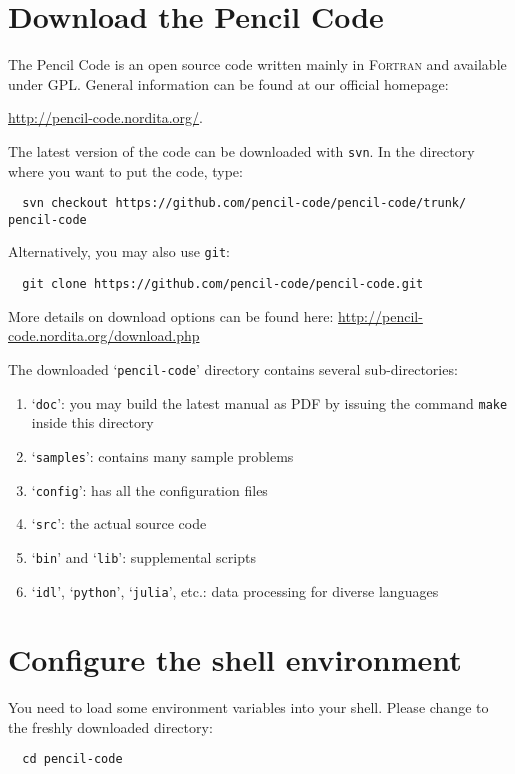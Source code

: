 \documentclass[a4paper,12pt]{article}
\newcommand{\command}[1]{\texttt{#1}}
\newcommand{\directory}[1]{`\texttt{#1}'}
\newcommand{\name}[1]{\textsc{#1}}
\begin{document}
\section{Download the Pencil Code}
The Pencil Code is an open source code written mainly in \name{Fortran} and available under GPL.
General information can be found at our official homepage:

\url{http://pencil-code.nordita.org/}.

The latest version of the code can be downloaded with \command{svn}. In the
directory where you want to put the code, type:
\begin{verbatim}
  svn checkout https://github.com/pencil-code/pencil-code/trunk/ pencil-code
\end{verbatim}

Alternatively, you may also use \command{git}:
\begin{verbatim}
  git clone https://github.com/pencil-code/pencil-code.git
\end{verbatim}

More details on download options can be found here: \url{http://pencil-code.nordita.org/download.php}

The downloaded \directory{pencil-code} directory contains several sub-directories:
\begin{enumerate}
  \item \directory{doc}: you may build the latest manual as PDF by issuing the command \command{make} inside this directory
  \item \directory{samples}: contains many sample problems
  \item \directory{config}: has all the configuration files
  \item \directory{src}: the actual source code
  \item \directory{bin} and \directory{lib}: supplemental scripts
  \item \directory{idl}, \directory{python}, \directory{julia}, etc.: data processing for diverse languages
\end{enumerate}


\section{Configure the shell environment}

You need to load some environment variables into your shell.
Please change to the freshly downloaded directory:
\begin{verbatim}
  cd pencil-code
\end{verbatim}
\end{document}
